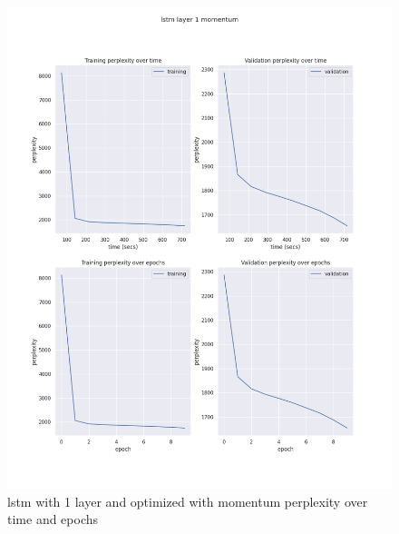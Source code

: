 \documentclass[12pt]{article}
\theoremstyle{definition}
\begin{document}
\begin{figure}[H]
     \centering
     \includegraphics[scale=0.4]{lstm_layer_1_momentum.png}
     \caption{lstm with 1 layer and optimized with momentum perplexity over time and epochs}
\end{figure}
\end{document}
